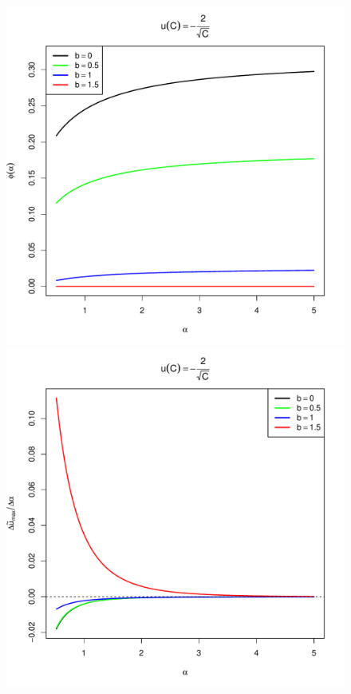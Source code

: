 \documentclass[11pt,a4]{amsart}
\newcommand{\1}{{\mathbf 1}}
\begin{document}
\begin{figure}[htb!]
  \begin{minipage}{0.5\linewidth}
    \includegraphics[width=\textwidth]{phi_hat_b_t_power.pdf}
  \end{minipage}\hfill
  \begin{minipage}{0.5\linewidth}
    \includegraphics[width=\textwidth]{U_b_t_power.pdf}

\end{minipage}
\end{figure}
\end{document}
